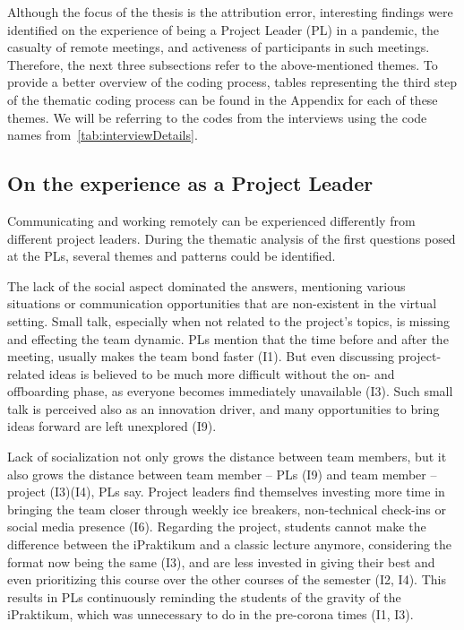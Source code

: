 Although the focus of the thesis is the attribution error, interesting findings were identified on the experience of being a Project Leader (PL) in a pandemic, the casualty of remote meetings, and activeness of participants in such meetings. Therefore, the next three subsections refer to the above-mentioned themes. To provide a better overview of the coding process, tables representing the third step of the thematic coding process can be found in the Appendix for each of these themes. We will be referring to the codes from the interviews using the code names from~\autoref{tab:interviewDetails}.

\subsection{On the experience as a Project Leader}

Communicating and working remotely can be experienced differently from different project leaders. During the thematic analysis of the first questions posed at the PLs, several themes and patterns could be identified.

The lack of the social aspect dominated the answers, mentioning various situations or communication opportunities that are non-existent in the virtual setting. Small talk, especially when not related to the project’s topics, is missing and effecting the team dynamic. PLs mention that the time before and after the meeting, usually makes the team bond faster (I1). But even discussing project-related ideas is believed to be much more difficult without the on- and offboarding phase, as everyone becomes immediately unavailable (I3). Such small talk is perceived also as an innovation driver, and many opportunities to bring ideas forward are left unexplored (I9). 

Lack of socialization not only grows the distance between team members, but it also grows the distance between team member – PLs (I9) and team member – project (I3)(I4), PLs say. Project leaders find themselves investing more time in bringing the team closer through weekly ice breakers, non-technical check-ins or social media presence (I6). Regarding the project, students cannot make the difference between the iPraktikum and a classic lecture anymore, considering the format now being the same (I3), and are less invested in giving their best and even prioritizing this course over the other courses of the semester (I2, I4). This results in PLs continuously reminding the students of the gravity of the iPraktikum, which was unnecessary to do in the pre-corona times (I1, I3).

